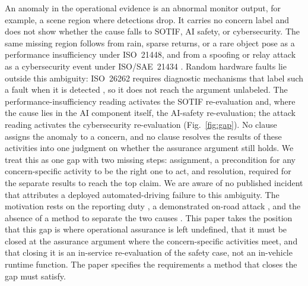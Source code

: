 \documentclass[conference,a4paper]{IEEEtran}
\begin{document}
	An anomaly in the operational evidence is an abnormal monitor output, for example, a scene region where detections drop. It carries no concern label and does not show whether the cause falls to SOTIF, AI safety, or cybersecurity. The same missing region follows from rain, sparse returns, or a rare object pose as a performance insufficiency under ISO~21448, and from a spoofing or relay attack as a cybersecurity event under ISO/SAE~21434 \cite{Sato2025}. Random hardware faults lie outside this ambiguity: ISO~26262 requires diagnostic mechanisms that label such a fault when it is detected \cite{ISO26262}, so it does not reach the argument unlabeled. The performance-insufficiency reading activates the SOTIF re-evaluation and, where the cause lies in the AI component itself, the AI-safety re-evaluation; the attack reading activates the cybersecurity re-evaluation (Fig.~\ref{fig:gap}). No clause assigns the anomaly to a concern, and no clause resolves the results of these activities into one judgment on whether the assurance argument still holds. We treat this as one gap with two missing steps: assignment, a precondition for any concern-specific activity to be the right one to act, and resolution, required for the separate results to reach the top claim. We are aware of no published incident that attributes a deployed automated-driving failure to this ambiguity. The motivation rests on the reporting duty \cite{UNECE2026}, a demonstrated on-road attack \cite{Sato2025}, and the absence of a method to separate the two causes \cite{Gao2022}. This paper takes the position that this gap is where operational assurance is left undefined, that it must be closed at the assurance argument where the concern-specific activities meet, and that closing it is an in-service re-evaluation of the safety case, not an in-vehicle runtime function. The paper specifies the requirements a method that closes the gap must satisfy.
	
\end{document}
